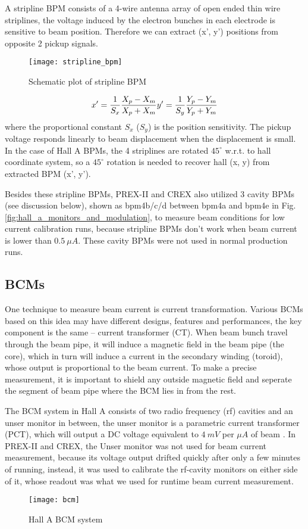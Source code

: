 A stripline BPM consists of a 4-wire antenna array of open ended thin wire striplines, 
the voltage induced by the electron bunches in each electrode is sensitive to beam position.
Therefore we can extract (x', y') positions from opposite 2 pickup signals.
\begin{figure}
    \centering
    \texttt{[image: stripline\_bpm]}
    \caption{Schematic plot of stripline BPM}
\end{figure}
\begin{equation}
    x' = \frac{1}{S_x} \frac{X_p - X_m}{X_p + X_m}   \\
    y' = \frac{1}{S_y} \frac{Y_p - Y_m}{Y_p + Y_m}   
\end{equation}
where the proportional constant $S_x$ ($S_y$) is the position sensitivity. 
The pickup voltage responds linearly to beam displacement when the displacement
is small. In the case of Hall A BPMs, the 4 striplines are rotated $45^\circ$
w.r.t. to hall coordinate system, so a $45^\circ$ rotation is needed to recover
hall (x, y) from extracted BPM (x', y').

Besides these stripline BPMs, PREX-II and CREX also utilized 3 cavity BPMs (see discussion below),
shown as bpm4b/c/d between bpm4a and bpm4e in Fig. \ref{fig:hall_a_monitors_and_modulation},
to measure beam conditions for low current calibration runs, because stripline
BPMs don't work when beam current is lower than $0.5\ \mu A$. These cavity
BPMs were not used in normal production runs.

\subsection{BCMs}
One technique to measure beam current is current transformation.
Various BCMs based on this idea may have different designs, features and performances, 
the key component is the same -- current transformer (CT). When beam bunch 
travel through the beam pipe, it will induce a magnetic field in the beam pipe (the core), 
which in turn will induce a current in the secondary winding (toroid), 
whose output is proportional to the beam current. 
To make a precise measurement, it is important to shield any outside magnetic 
field and seperate the segment of beam pipe where the BCM lies in from the rest.

The BCM system in Hall A consists of two radio frequency (rf) cavities and
an unser monitor in between, the unser monitor is a parametric current transformer (PCT),
which will output a DC voltage equivalent to $4\ mV$ per $\mu A$ of beam \cite{987367}.
In PREX-II and CREX, the Unser monitor was not used for beam current measurement,
because its voltage output drifted quickly after only a few minutes of running,
instead, it was used to calibrate the rf-cavity monitors on either side of it,
whose readout was what we used for runtime beam current measurement.
\begin{figure}
    \centering
    \texttt{[image: bcm]}
    \caption{Hall A BCM system \cite{987367}}
\end{figure}

